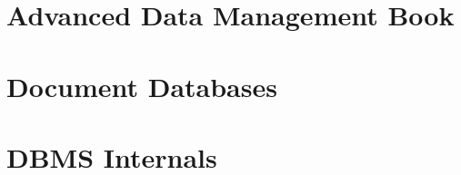 \documentclass[12pt,oneside]{report}
\newcommand{\newblanckpage}{
    \newpage
    \thispagestyle{plain} %
    \mbox{}
}
\begin{document}

\restoregeometry




\tableofcontents
\listoffigures


\clearpage


\setcounter{page}{1}

\part{Advanced Data Management Book}























\part{Document Databases}





\part{DBMS Internals}
\end{document}
